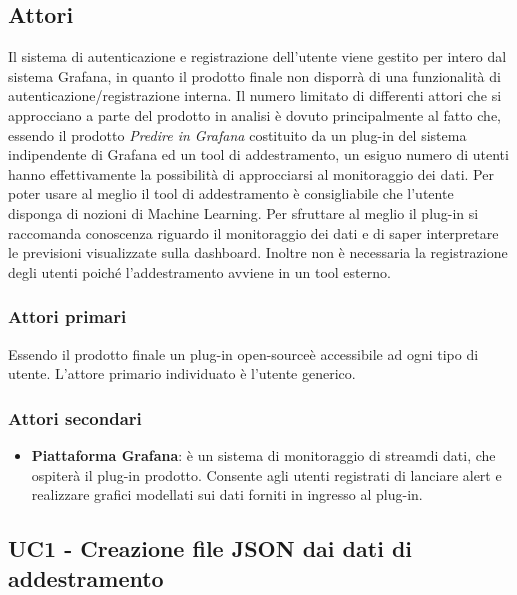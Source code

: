 	\subsection{Attori}
Il sistema di autenticazione e registrazione dell'utente viene gestito per intero dal sistema Grafana, in quanto il prodotto finale non disporrà di una funzionalità di autenticazione/registrazione interna.									
Il numero limitato di differenti attori che si approcciano a parte del prodotto in analisi è dovuto principalmente al fatto che, essendo il prodotto \emph{Predire in Grafana} costituito da un plug-in del sistema indipendente di Grafana ed un tool di addestramento, un esiguo numero di utenti hanno effettivamente la possibilità di approcciarsi al monitoraggio dei dati.
Per poter usare al meglio il tool di addestramento è consigliabile che l'utente disponga di nozioni di Machine Learning. Per sfruttare al meglio il plug-in si raccomanda conoscenza riguardo il monitoraggio dei dati e di saper interpretare le previsioni visualizzate sulla dashboard. 
Inoltre non è necessaria la  registrazione degli utenti poiché l'addestramento avviene in un tool esterno.


	\subsubsection{Attori primari}
Essendo il prodotto finale un plug-in open-source\glo è accessibile ad ogni tipo di utente. L'attore primario individuato è l'utente generico.
	\subsubsection{Attori secondari}
	\begin{itemize}
		\item\textbf{Piattaforma Grafana}: è un sistema di monitoraggio di stream\glo di dati, che ospiterà il plug-in prodotto. Consente agli utenti registrati di lanciare alert e realizzare grafici modellati sui dati forniti in ingresso al plug-in.
	\end{itemize}


	\label{par:UC1}
	\subsection{UC1 - Creazione file JSON dai dati di addestramento}

